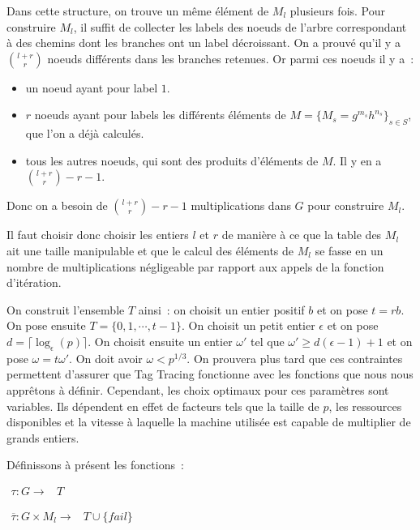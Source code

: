 		Dans cette structure, on trouve un même élément de $M_l$ plusieurs fois. Pour construire $M_l$, il suffit de collecter les labels des noeuds de l'arbre correspondant à des chemins dont les branches ont un label décroissant. On a prouvé qu'il y a $\binom{l+r}{r}$ noeuds différents dans les branches retenues. Or parmi ces noeuds il y a~:
		
		\begin{itemize}
		\item un noeud ayant pour label $1$.
		\item $r$ noeuds ayant pour labels les différents éléments de $M = \{M_s = g^{m_s} h^{n_s}\}_{s \in S}$, que l'on a déjà calculés.
		\item tous les autres noeuds, qui sont des produits d'éléments de $M$. Il y en a $\binom{l+r}{r} - r - 1$.
		\end{itemize}
		
		Donc on a besoin de $\binom{l+r}{r} - r - 1$ multiplications dans $G$ pour construire $M_l$.
		
		Il faut choisir donc choisir les entiers $l$ et $r$ de manière à ce que la table des $M_l$ ait une taille manipulable et que le calcul des éléments de $M_l$ se fasse en un nombre de multiplications négligeable par rapport aux appels de la fonction d'itération.
		
		On construit l'ensemble $T$ ainsi~: on choisit un entier positif $b$ et on pose $t = rb$. On pose ensuite $T = \{0,1,\cdots,t-1\}$. On choisit un petit entier $\epsilon$ et on pose $d = \lceil\log_\epsilon(p)\rceil$. On choisit ensuite un entier $\omega'$ tel que $\omega' \ge d(\epsilon - 1) + 1$ et on pose $\omega = t\omega'$. On doit avoir $\omega < p^{1/3}$. On prouvera plus tard que ces contraintes permettent d'assurer que Tag Tracing fonctionne avec les fonctions que nous nous apprêtons à définir. Cependant, les choix optimaux pour ces paramètres sont variables. Ils dépendent en effet de facteurs tels que la taille de $p$, les ressources disponibles et la vitesse à laquelle la machine utilisée est capable de multiplier de grands entiers.
		
		Définissons à présent les fonctions~:
		
		$\begin{array}{lrcl}
		\tau : G \longrightarrow & T
		\end{array}$
		
		$\begin{array}{lrcl}
		\overline{\tau} : G \times M_l \longrightarrow & T \cup \{fail\}
		\end{array}$
		
